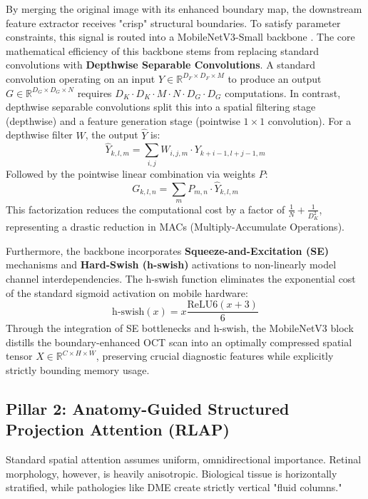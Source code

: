 \documentclass[journal]{IEEEtran}
\begin{document}
By merging the original image with its enhanced boundary map, the downstream feature extractor receives "crisp" structural boundaries. To satisfy parameter constraints, this signal is routed into a MobileNetV3-Small backbone \cite{howard2019searching}. The core mathematical efficiency of this backbone stems from replacing standard convolutions with \textbf{Depthwise Separable Convolutions}. A standard convolution operating on an input $Y \in \mathbb{R}^{D_F \times D_F \times M}$ to produce an output $G \in \mathbb{R}^{D_G \times D_G \times N}$ requires $D_K \cdot D_K \cdot M \cdot N \cdot D_G \cdot D_G$ computations. In contrast, depthwise separable convolutions split this into a spatial filtering stage (depthwise) and a feature generation stage (pointwise $1\times1$ convolution). For a depthwise filter $W$, the output $\hat{Y}$ is:
\begin{equation}
    \hat{Y}_{k,l,m} = \sum_{i,j} W_{i,j,m} \cdot Y_{k+i-1, l+j-1, m}
\end{equation}
Followed by the pointwise linear combination via weights $P$:
\begin{equation}
    G_{k,l,n} = \sum_{m} P_{m,n} \cdot \hat{Y}_{k,l,m}
\end{equation}
This factorization reduces the computational cost by a factor of $\frac{1}{N} + \frac{1}{D_K^2}$, representing a drastic reduction in MACs (Multiply-Accumulate Operations).

Furthermore, the backbone incorporates \textbf{Squeeze-and-Excitation (SE)} mechanisms and \textbf{Hard-Swish (h-swish)} activations to non-linearly model channel interdependencies. The h-swish function eliminates the exponential cost of the standard sigmoid activation on mobile hardware:
\begin{equation}
    \text{h-swish}(x) = x \frac{\text{ReLU6}(x+3)}{6}
\end{equation}
Through the integration of SE bottlenecks and h-swish, the MobileNetV3 block distills the boundary-enhanced OCT scan into an optimally compressed spatial tensor $X \in \mathbb{R}^{C \times H \times W}$, preserving crucial diagnostic features while explicitly strictly bounding memory usage.

\subsection{Pillar 2: Anatomy-Guided Structured Projection Attention (RLAP)}
Standard spatial attention assumes uniform, omnidirectional importance. Retinal morphology, however, is heavily anisotropic. Biological tissue is horizontally stratified, while pathologies like DME create strictly vertical "fluid columns."
\end{document}
